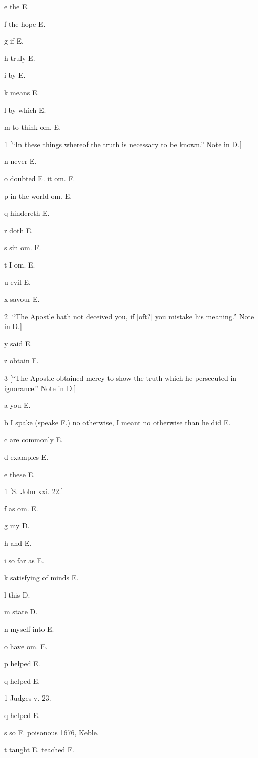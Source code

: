 e
the E.

f
the hope E.

g
if E.

h
truly E.

i
by E.

k
means E.

l
by which E.

m
to think om. E.

1
[“In these things whereof the truth is necessary to be known.” Note in D.]

n
never E.

o
doubted E. it om. F.

p
in the world om. E.

q
hindereth E.

r
doth E.

s
sin om. F.

t
I om. E.

u
evil E.

x
savour E.

2
[“The Apostle hath not deceived you, if [oft?] you mistake his meaning.” Note in D.]

y
said E.

z
obtain F.

3
[“The Apostle obtained mercy to show the truth which he persecuted in ignorance.” Note in D.]

a
you E.

b
I spake (speake F.) no otherwise, I meant no otherwise than he did E.

c
are commonly E.

d
examples E.

e
these E.

1
[S. John xxi. 22.]

f
as om. E.

g
my D.

h
and E.

i
so far as E.

k
satisfying of minds E.

l
this D.

m
state D.

n
myself into E.

o
have om. E.

p
helped E.

q
helped E.

1
Judges v. 23.

q
helped E.

s
so F. poisonous 1676, Keble.

t
taught E. teached F.

